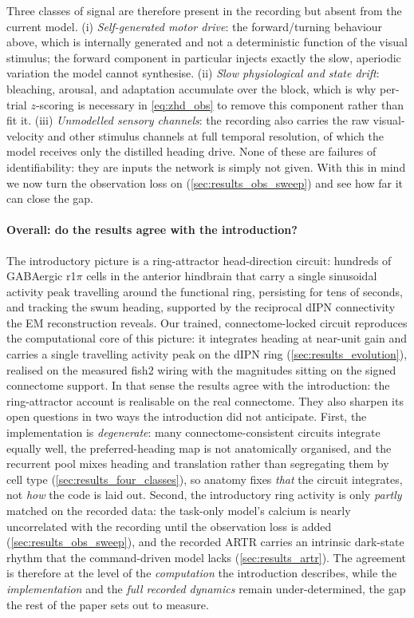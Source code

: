 \documentclass[11pt]{article}
\def\rpi{r1\ensuremath{\pi}}
\begin{document}
Three classes of signal are therefore present in the recording but
absent from the current model. (i) \emph{Self-generated motor drive}:
the forward/turning behaviour above, which is internally generated
and not a deterministic function of the visual stimulus; the forward
component in particular injects exactly the slow, aperiodic variation
the model cannot synthesise. (ii) \emph{Slow physiological and state
drift}: bleaching, arousal, and adaptation accumulate over the
block, which is why per-trial $z$-scoring is necessary in
\cref{eq:zhd_obs} to remove this component rather than fit it.
(iii) \emph{Unmodelled sensory channels}: the recording also
carries the raw visual-velocity and other stimulus channels at full
temporal resolution, of which the model receives only the distilled
heading drive. None of these are failures of identifiability: they
are inputs the network is simply not given. With this in mind we now
turn the observation loss on (\cref{sec:results_obs_sweep}) and see
how far it can close the gap.

\paragraph{Overall: do the results agree with the introduction?}
The introductory picture is a ring-attractor head-direction circuit:
hundreds of GABAergic \rpi{} cells in the anterior hindbrain that carry a
single sinusoidal activity peak travelling around the functional ring,
persisting for tens of seconds, and tracking the swum heading, supported
by the reciprocal dIPN connectivity the EM reconstruction reveals. Our
trained, connectome-locked circuit reproduces
the computational core of this picture: it integrates heading at
near-unit gain and carries a single travelling activity peak on the dIPN
ring (\cref{sec:results_evolution}), realised on the measured fish2
wiring with the magnitudes sitting on the signed connectome support. In
that sense the results agree with the introduction: the ring-attractor
account is realisable on the real connectome. They also sharpen its open
questions in two ways the introduction did not anticipate. First, the
implementation is \emph{degenerate}: many connectome-consistent circuits
integrate equally well, the preferred-heading map is not anatomically
organised, and the recurrent pool mixes heading and translation rather
than segregating them by cell type (\cref{sec:results_four_classes}),
so anatomy fixes \emph{that} the circuit integrates, not \emph{how} the
code is laid out. Second, the introductory ring activity is only
\emph{partly} matched on the recorded data: the task-only model's calcium
is nearly uncorrelated with the recording until the observation loss is
added (\cref{sec:results_obs_sweep}), and the recorded ARTR carries an
intrinsic dark-state rhythm that the command-driven model lacks
(\cref{sec:results_artr}). The agreement is therefore at the level of the
\emph{computation} the introduction describes, while the
\emph{implementation} and the \emph{full recorded dynamics} remain
under-determined, the gap the rest of the paper sets out to measure.
\end{document}
